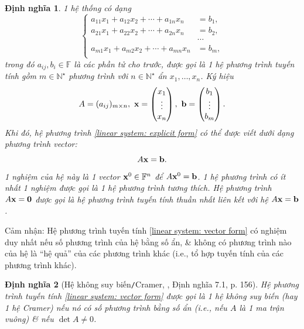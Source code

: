 \documentclass{article}
\newtheorem{dinhnghia}{Định nghĩa}
\begin{document}
\begin{dinhnghia}
	1 hệ thống có dạng
	\begin{equation}
		\label{linear system: explicit form}
		\left\{\begin{split}
			a_{11}x_1 + a_{12}x_2 + \cdots + a_{1n}x_n &= b_1,\\
			a_{21}x_1 + a_{22}x_2 + \cdots + a_{2n}x_n &= b_2,\\
			&\cdots\\
			a_{m1}x_1 + a_{m2}x_2 + \cdots + a_{mn}x_n &= b_m,\\
		\end{split}\right.
	\end{equation}
	trong đó $a_{ij},b_i\in\mathbb{F}$ là các phần tử cho trước, được gọi là 1 {\rm hệ phương trình tuyến tính} gồm $m\in\mathbb{N}^\star$ phương trình với $n\in\mathbb{N}^\star$ ẩn $x_1,\ldots,x_n$. Ký hiệu
	\begin{equation*}
		A = (a_{ij})_{m\times n},\ {\bf x} = \begin{pmatrix}
			x_1\\\vdots\\x_n
		\end{pmatrix},\ {\bf b} = \begin{pmatrix}
			b_1\\\vdots\\b_m
		\end{pmatrix}.
	\end{equation*}
	Khi đó, hệ phương trình \eqref{linear system: explicit form} có thể được viết dưới dạng phương trình vector:
	\begin{equation}
		\label{linear system: vector form}
		A{\bf x} = {\bf b}.
	\end{equation}
	1 {\rm nghiệm} của hệ này là 1 vector ${\bf x}^0\in\mathbb{F}^n$ để $A{\bf x}^0 = {\bf b}$. 1 hệ phương trình có ít nhất 1 nghiệm được gọi là 1 {\rm hệ phương trình tương thích}. Hệ phương trình $A{\bf x} = {\bf0}$ được gọi là {\rm hệ phương trình tuyến tính thuần nhất} liên kết với hệ $A{\bf x} = {\bf b}$.
\end{dinhnghia}
Cảm nhận: Hệ phương trình tuyến tính \eqref{linear system: vector form} có nghiệm duy nhất nếu số phương trình của hệ bằng số ẩn, \& không có phương trình nào của hệ là ``hệ quả'' của các phương trình khác (i.e., tổ hợp tuyến tính của các phương trình khác).

\begin{dinhnghia}[Hệ không suy biến{\tt/}Cramer, \cite{Hung_linear_algebra}, Định nghĩa 7.1, p. 156]
	Hệ phương trình tuyến tính \eqref{linear system: vector form} được gọi là 1 {\rm hệ không suy biến} (hay 1 {\rm hệ Cramer}) nếu nó có số phương trình bằng số ẩn (i.e., nếu $A$ là 1 ma trận vuông) \& nếu $\det A\ne 0$.
\end{dinhnghia}
\end{document}
